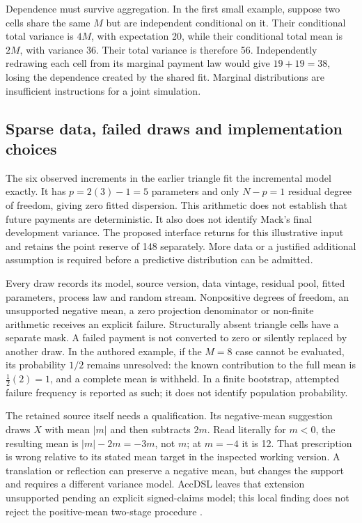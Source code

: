 Dependence must survive aggregation. In the first small example, suppose
two cells share the same $M$ but are independent conditional on it. Their
conditional total variance is $4M$, with expectation 20, while their
conditional total mean is $2M$, with variance 36. Their total variance
is therefore 56. Independently redrawing each cell from its marginal
payment law would give $19+19=38$, losing the dependence created by the
shared fit. Marginal distributions are insufficient instructions for a
joint simulation.

\subsection{Sparse data, failed draws and implementation choices}

The six observed increments in the earlier triangle fit the incremental
model exactly. It has $p=2(3)-1=5$ parameters and only $N-p=1$ residual
degree of freedom, giving zero fitted dispersion. This arithmetic does
not establish that future payments are deterministic. It also does not
identify Mack's final development variance. The proposed interface returns
 for this illustrative input and retains the
point reserve of 148 separately. More data or a justified additional
assumption is required before a predictive distribution can be admitted.

Every draw records its model, source version, data vintage, residual pool,
fitted parameters, process law and random stream. Nonpositive degrees of
freedom, an unsupported negative mean, a zero projection denominator or
non-finite arithmetic receives an explicit failure. Structurally absent
triangle cells have a separate mask. A failed payment is not converted
to zero or silently replaced by another draw. In the authored example,
if the $M=8$ case cannot be evaluated, its probability $1/2$ remains
unresolved: the known contribution to the full mean is $\tfrac12(2)=1$,
and a complete mean is withheld. In a finite bootstrap, attempted
failure frequency is reported as such; it does not identify population
probability.

The retained source itself needs a qualification. Its negative-mean
suggestion draws $X$ with mean $|m|$ and then subtracts $2m$. Read
literally for $m<0$, the resulting mean is $|m|-2m=-3m$, not $m$;
at $m=-4$ it is 12. That prescription is wrong relative to its stated
mean target in the inspected working version. A translation or reflection
can preserve a negative mean, but changes the support and requires a
different variance model. AccDSL leaves that extension unsupported
pending an explicit signed-claims model; this local finding does not
reject the positive-mean two-stage procedure
\citep[Section 3, final paragraph]{england2001addendum}.

